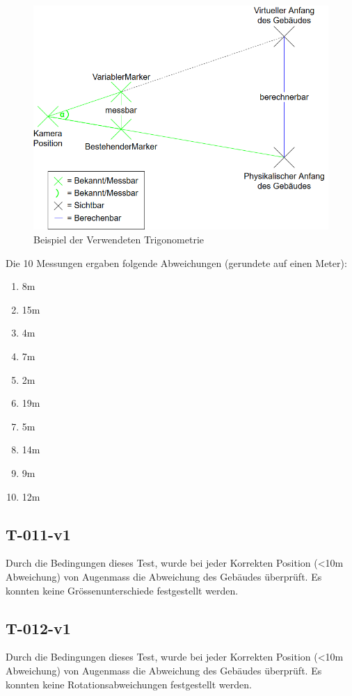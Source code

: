 \documentclass[a4paper]{scrreprt}
\begin{document}
\begin{figure}[h!]
	\center
	\includegraphics[keepaspectratio, width=\textwidth / 2]{TrigonometrieBeispiel.png}
	\caption{Beispiel der Verwendeten Trigonometrie}
	\label{fig:TrigometrieBeispiel}
\end{figure}

Die 10 Messungen ergaben folgende Abweichungen (gerundete auf einen Meter):
\begin{enumerate}
	\item 8m
	\item 15m
	\item 4m
	\item 7m
	\item 2m
	\item 19m
	\item 5m
	\item 14m
	\item 9m
	\item 12m
\end{enumerate}
\subsection{T-011-v1}
Durch die Bedingungen dieses Test, wurde bei jeder Korrekten Position (<10m Abweichung) von Augenmass die Abweichung des Gebäudes überprüft. Es konnten keine Grössenunterschiede festgestellt werden.
\subsection{T-012-v1}
Durch die Bedingungen dieses Test, wurde bei jeder Korrekten Position (<10m Abweichung) von Augenmass die Abweichung des Gebäudes überprüft. Es konnten keine Rotationsabweichungen festgestellt werden.
\end{document}
